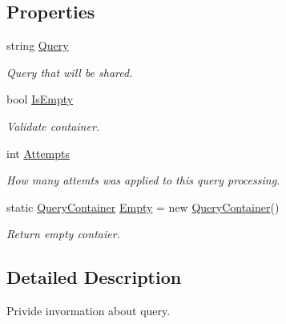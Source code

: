 \subsection*{Properties}
\begin{DoxyCompactItemize}
\item 
string \mbox{\hyperlink{struct_pipes_provider_1_1_client_1_1_query_container_ada0fa04c68e6aee41d3d811d699d01aa}{Query}}
\begin{DoxyCompactList}\small\item\em Query that will be shared. \end{DoxyCompactList}\item 
bool \mbox{\hyperlink{struct_pipes_provider_1_1_client_1_1_query_container_ab2ceeaac61f04d4ce7e41bc8ea931a0f}{Is\+Empty}}
\begin{DoxyCompactList}\small\item\em Validate container. \end{DoxyCompactList}\item 
int \mbox{\hyperlink{struct_pipes_provider_1_1_client_1_1_query_container_a565336905463066277e39b0dbe606112}{Attempts}}
\begin{DoxyCompactList}\small\item\em How many attemts was applied to this query processing. \end{DoxyCompactList}\item 
static \mbox{\hyperlink{struct_pipes_provider_1_1_client_1_1_query_container}{Query\+Container}} \mbox{\hyperlink{struct_pipes_provider_1_1_client_1_1_query_container_a0e1f91d0a990824b56170c3da5e5919c}{Empty}} = new \mbox{\hyperlink{struct_pipes_provider_1_1_client_1_1_query_container}{Query\+Container}}()
\begin{DoxyCompactList}\small\item\em Return empty contaier. \end{DoxyCompactList}\end{DoxyCompactItemize}


\subsection{Detailed Description}
Privide invormation about query. 



